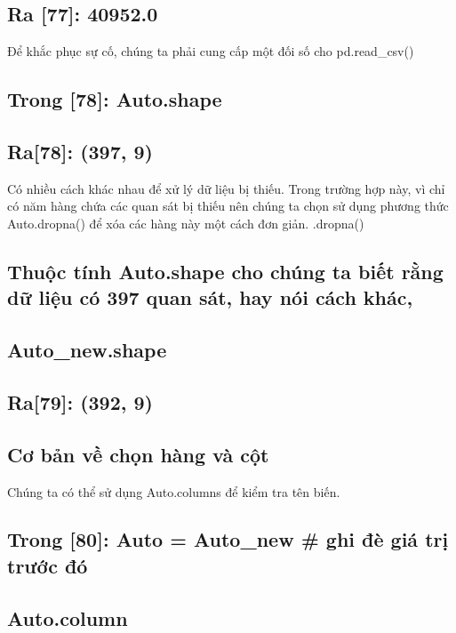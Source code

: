 \subsection{Ra [77]: 40952.0}

Để khắc phục sự cố, chúng ta phải cung cấp một đối số cho pd.read\_csv()

\subsection{Trong [78]: Auto.shape}

\subsection{Ra[78]: (397, 9)}

Có nhiều cách khác nhau để xử lý dữ liệu bị thiếu. Trong trường hợp này, vì chỉ có năm hàng chứa các quan sát bị thiếu nên chúng ta chọn sử dụng phương thức Auto.dropna() để xóa các hàng này một cách đơn giản. .dropna()

\subsection{Thuộc tính Auto.shape cho chúng ta biết rằng dữ liệu có 397 quan sát, hay nói cách khác,}

\subsection{Auto\_new.shape}

\subsection{Ra[79]: (392, 9)}

\subsection{Cơ bản về chọn hàng và cột}

Chúng ta có thể sử dụng Auto.columns để kiểm tra tên biến.

\subsection{Trong [80]: Auto = Auto\_new \# ghi đè giá trị trước đó}

\subsection{Auto.column}

